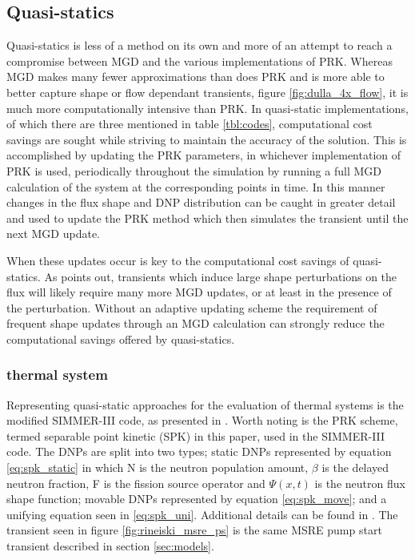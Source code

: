 \documentclass[review]{elsarticle}
\begin{document}
\subsection{Quasi-statics} \label{ssec:qs}
Quasi-statics is less of a method on its own and more of an attempt to
reach a compromise between MGD and the various implementations of PRK. Whereas
MGD makes many fewer approximations than does PRK and is more able to better
capture shape or flow dependant transients, figure \ref{fig:dulla_4x_flow},
it is much more computationally intensive than PRK. In quasi-static
implementations, of which there are three mentioned in table \ref{tbl:codes},
computational cost savings are sought while striving to maintain the accuracy
of the solution. This is accomplished by updating the PRK parameters, in
whichever implementation of PRK is used, periodically throughout the simulation
by running a full MGD calculation of the system at the corresponding points
in time. In this manner changes in the flux shape and DNP distribution can
be caught in greater detail and used to update the PRK method which then 
simulates the transient until the next MGD update.
\par When these updates occur is key to the computational cost savings of
quasi-statics. As \cite{dulla_models_2005} points out, transients which induce
large shape perturbations on the flux will likely require many more MGD
updates, or at least in the presence of the perturbation. Without an adaptive
updating scheme the requirement of frequent shape updates through an MGD
calculation can strongly reduce the computational savings offered by
quasi-statics.

\subsubsection{thermal system} \label{sssec:qs_therm}
Representing quasi-static approaches for the evaluation of thermal systems
is the modified SIMMER-III code, as presented in \cite{rineiski_kinetics_2005}.
Worth noting is the PRK scheme, termed separable point kinetic (SPK) in this
paper, used in the SIMMER-III code. The DNPs are split into two types;
static DNPs represented by equation \ref{eq:spk_static} in which N is the
neutron
population amount, $\beta$ is the delayed neutron fraction, F is the fission
source operator and $\Psi(x,t)$ is the neutron flux shape function;
 movable DNPs represented by
equation \ref{eq:spk_move}; and a unifying equation seen in \ref{eq:spk_uni}.
Additional details can be found in \cite{rineiski_kinetics_2005}. The transient
seen in figure \ref{fig:rineiski_msre_ps} is the same MSRE pump start transient
described in section \ref{sec:models}.
\end{document}

